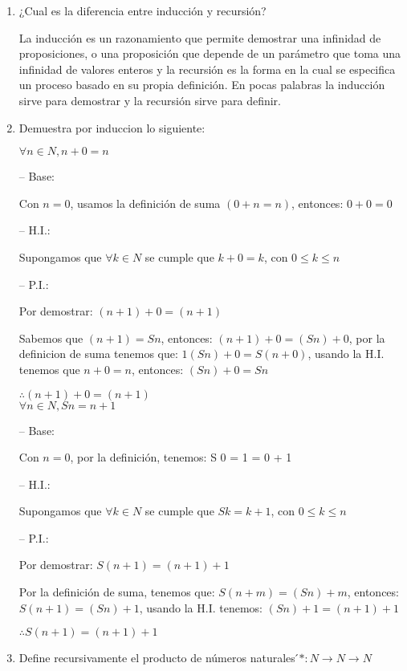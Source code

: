 \documentclass{article}
\begin{document}
\newpage


\begin{enumerate}
	
\item ¿Cual es la diferencia entre inducci\'on y recursi\'on?
	
La inducción es un razonamiento que permite demostrar una infinidad de proposiciones, o una proposición que depende de un parámetro  que toma una infinidad de valores enteros y la recursi\'on es la forma en la cual se especifica un proceso basado en su propia definición.
En pocas palabras la inducci\'on sirve para demostrar y la recursi\'on sirve para definir.
\item Demuestra por induccion lo siguiente:	

$\forall n \in N, n + 0 = n$ 	

– Base:

Con $n = 0$, usamos la definición de suma $(0 + n = n)$, entonces: $0 + 0 = 0$ \Checkmark

– H.I.:

Supongamos que $\forall k \in N$ se cumple que $k + 0 = k$, con $0 \leq k \leq n$ \Checkmark

– P.I.:

Por demostrar: $(n + 1) + 0 = (n + 1)$

Sabemos que $(n+1) = S n$, entonces: $(n+1)+0 = (S n)+0$, por la definicion de suma tenemos que:
$1(S n) + 0 = S (n + 0)$, usando la H.I. tenemos que $n + 0 = n$, entonces:
$(S n) + 0 = S n$

$\therefore (n + 1) + 0 = (n + 1)$ \Checkmark \\

$\forall n \in N, S n = n + 1$

– Base:

Con $n = 0$, por la definición, tenemos: S 0 = 1 = 0 + 1 \Checkmark

– H.I.:

Supongamos que $\forall k \in N$ se cumple que $S k = k + 1$, con $0 \leq k \leq n$ \Checkmark

– P.I.:

Por demostrar: $S (n + 1) = (n + 1) + 1$

Por la definición de suma, tenemos que: $S (n + m) = (S n) + m$, entonces:
$S (n + 1) = (S n) + 1$, usando la H.I. tenemos: $(S n) + 1 = (n + 1) + 1$

$\therefore S (n + 1) = (n + 1) + 1$ \Checkmark \\

\item Define recursivamente el producto de n\'umeros naturales  ́$\ast : N \rightarrow N \rightarrow N$


\end{enumerate}
\end{document}
